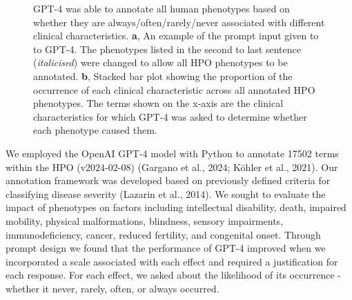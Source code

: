 \documentclass[
]{agujournal2019}
\begin{document}
\label{cell-fig-occurrence}
\begin{figure}[H]


\caption{\label{fig-occurrence}GPT-4 was able to annotate all human
phenotypes based on whether they are always/often/rarely/never
associated with different clinical characteristics. \textbf{a}, An
example of the prompt input given to to GPT-4. The phenotypes listed in
the second to last sentence (\emph{italicised}) were changed to allow
all HPO phenotypes to be annotated. \textbf{b}, Stacked bar plot showing
the proportion of the occurrence of each clinical characteristic across
all annotated HPO phenotypes. The terms shown on the x-axis are the
clinical characteristics for which GPT-4 was asked to determine whether
each phenotype caused them.}

\end{figure}%

We employed the OpenAI GPT-4 model with Python to annotate 17502 terms
within the HPO (v2024-02-08) (Gargano et al., 2024; Köhler et al.,
2021). Our annotation framework was developed based on previously
defined criteria for classifying disease severity (Lazarin et al.,
2014). We sought to evaluate the impact of phenotypes on factors
including intellectual disability, death, impaired mobility, physical
malformations, blindness, sensory impairments, immunodeficiency, cancer,
reduced fertility, and congenital onset. Through prompt design we found
that the performance of GPT-4 improved when we incorporated a scale
associated with each effect and required a justification for each
response. For each effect, we asked about the likelihood of its
occurrence - whether it never, rarely, often, or always occurred.
\end{document}
